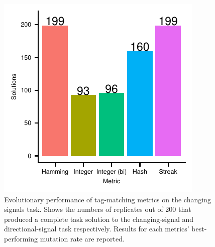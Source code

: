 \begin{figure}
\centering
\includegraphics[width=0.75\linewidth]{img/gp_results/panel-cst-sols.pdf}

\caption{
Evolutionary performance of tag-matching metrics on the changing signals task.
Shows the numbers of replicates out of 200 that produced a complete task solution to the changing-signal and directional-signal task respectively.
Results for each metrics' best-performing mutation rate are reported.
}

\label{fig:cst-sols}

\end{figure}